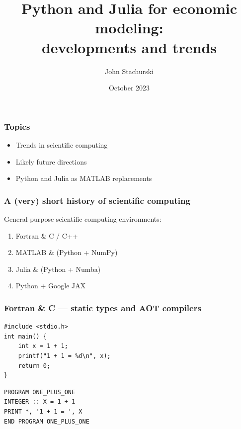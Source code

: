 \documentclass[
    xcolor={svgnames,dvipsnames},
    hyperref={colorlinks, citecolor=DeepPink4, linkcolor=DarkRed, urlcolor=DarkBlue}
    ]{beamer}  %
\title{Python and Julia for economic modeling: \\ developments and trends}
\author{John Stachurski}
\date{October 2023}
\newcommand{\1}{\mathbbm 1}
\begin{document}
\begin{frame}
  \titlepage
\end{frame}







\begin{frame}
    \frametitle{Topics}

    \begin{itemize}
        \item Trends in scientific computing
        \vspace{0.5em}
        \item Likely future directions
        \vspace{0.5em}
        \item Python and Julia as MATLAB replacements
    \end{itemize}

\end{frame}



\begin{frame}
    \frametitle{A (very) short history of scientific computing}


    General purpose scientific computing environments:

        \vspace{0.5em}
        \vspace{0.5em}
    \begin{enumerate}
        \item Fortran \& C / C++ 
        \vspace{0.5em}
        \vspace{0.5em}
        \item MATLAB \& (Python + NumPy)
        \vspace{0.5em}
        \vspace{0.5em}
        \item Julia \& (Python + Numba) 
        \vspace{0.5em}
        \vspace{0.5em}
        \item Python + Google JAX 
    \end{enumerate}

\end{frame}



\begin{frame}[fragile]
    \frametitle{Fortran \& C --- static types and AOT compilers}

    {\small
    \begin{verbatim}
#include <stdio.h>
int main() {
    int x = 1 + 1;
    printf("1 + 1 = %d\n", x);
    return 0;
}   
    \end{verbatim}
    }


    {\small
    \begin{verbatim}
PROGRAM ONE_PLUS_ONE  
INTEGER :: X = 1 + 1 
PRINT *, '1 + 1 = ', X
END PROGRAM ONE_PLUS_ONE 
    \end{verbatim}
    }

\end{frame}
\end{document}

